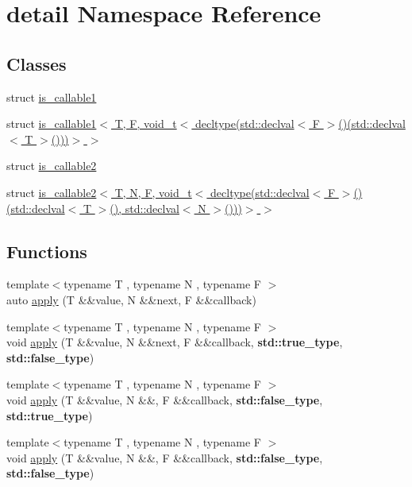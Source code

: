 \hypertarget{namespacedetail}{}\section{detail Namespace Reference}
\label{namespacedetail}
\subsection*{Classes}
\begin{DoxyCompactItemize}
\item 
struct \hyperlink{structdetail_1_1is__callable1}{is\+\_\+callable1}
\item 
struct \hyperlink{structdetail_1_1is__callable1_3_01_t_00_01_f_00_01void__t_3_01decltype_07std_1_1declval_3_01_f_0031734589d10bdb36da443f727c3d6f8}{is\+\_\+callable1$<$ T, F, void\+\_\+t$<$ decltype(std\+::declval$<$ F $>$()(std\+::declval$<$ T $>$()))$>$ $>$}
\item 
struct \hyperlink{structdetail_1_1is__callable2}{is\+\_\+callable2}
\item 
struct \hyperlink{structdetail_1_1is__callable2_3_01_t_00_01_n_00_01_f_00_01void__t_3_01decltype_07std_1_1declval_85e36b71e7ce49c039fb03c9fdc1f60f}{is\+\_\+callable2$<$ T, N, F, void\+\_\+t$<$ decltype(std\+::declval$<$ F $>$()(std\+::declval$<$ T $>$(), std\+::declval$<$ N $>$()))$>$ $>$}
\end{DoxyCompactItemize}
\subsection*{Functions}
\begin{DoxyCompactItemize}
\item 
{\footnotesize template$<$typename T , typename N , typename F $>$ }\\auto \hyperlink{namespacedetail_a910933a8b2f5acce683775f956e97d48}{apply} (T \&\&value, N \&\&next, F \&\&callback)
\item 
{\footnotesize template$<$typename T , typename N , typename F $>$ }\\void \hyperlink{namespacedetail_a3711fd6b77c0779d28e5a3608f1a8e51}{apply} (T \&\&value, N \&\&next, F \&\&callback, \textbf{ std\+::true\+\_\+type}, \textbf{ std\+::false\+\_\+type})
\item 
{\footnotesize template$<$typename T , typename N , typename F $>$ }\\void \hyperlink{namespacedetail_acbe3cd2b577d9cb1e2e9383021c208d4}{apply} (T \&\&value, N \&\&, F \&\&callback, \textbf{ std\+::false\+\_\+type}, \textbf{ std\+::true\+\_\+type})
\item 
{\footnotesize template$<$typename T , typename N , typename F $>$ }\\void \hyperlink{namespacedetail_a2de0e5f4ba1129708f2efe0d017826d7}{apply} (T \&\&value, N \&\&, F \&\&callback, \textbf{ std\+::false\+\_\+type}, \textbf{ std\+::false\+\_\+type})
\end{DoxyCompactItemize}



